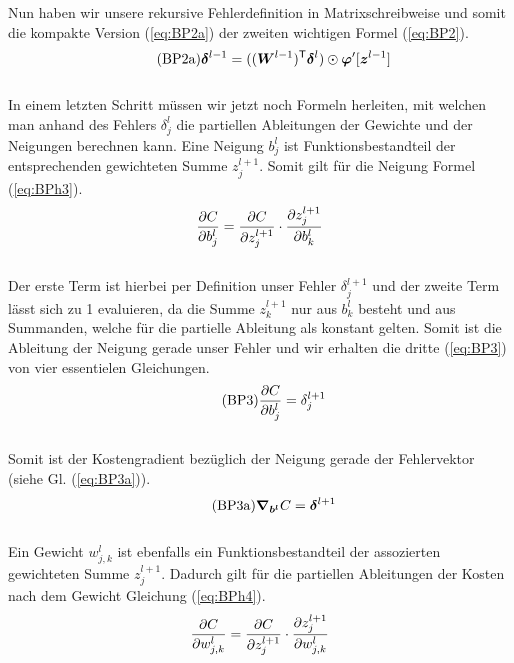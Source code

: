 Nun haben wir unsere rekursive Fehlerdefinition in Matrixschreibweise und somit
die kompakte Version (\ref{eq:BP2a}) der zweiten wichtigen Formel (\ref{eq:BP2}).
\\
\begin{equation}\tag{BP2a}\label{eq:BP2a}
  \bm{\delta}^{l-1} = ((\bm{W}^{l-1})^{\mathsf{T}} \bm{\delta}^l) \odot \bm{\varphi}'[\bm{z}^{l-1}]
\end{equation}
\\
In einem letzten Schritt müssen wir jetzt noch Formeln herleiten, mit welchen
man anhand des Fehlers $\delta_j^l$ die partiellen Ableitungen der Gewichte und
der Neigungen berechnen kann.
\para{}
Eine Neigung $b_j^l$ ist Funktionsbestandteil der entsprechenden gewichteten
Summe $z_j^{l+1}$. Somit gilt für die Neigung Formel (\ref{eq:BPh3}).
\\
\begin{equation}\label{eq:BPh3}
  \frac{\partial C}{\partial b_j^l} = \frac{\partial C}{\partial z_j^{l+1}} \cdot \frac{\partial z_j^{l+1}}{\partial b_k^l}
\end{equation}
\\
Der erste Term ist hierbei per Definition unser Fehler $\delta_j^{l+1}$ und der
zweite Term lässt sich zu 1 evaluieren, da die Summe $z_k^{l+1}$ nur aus
$b_k^l$ besteht und aus Summanden, welche für die partielle Ableitung als konstant gelten.
Somit ist die Ableitung der Neigung gerade unser Fehler und wir erhalten die
dritte (\ref{eq:BP3}) von vier essentielen Gleichungen.
\\
\begin{equation}\tag{BP3}\label{eq:BP3}
  \frac{\partial C}{\partial b_j^l} = \delta_j^{l+1}
\end{equation}
\\
Somit ist der Kostengradient bezüglich der Neigung gerade der Fehlervektor
(siehe Gl. (\ref{eq:BP3a})).
\\
\begin{equation}\tag{BP3a}\label{eq:BP3a}
  \bm{\nabla}_{\bm{b^l}} C =  \bm{\delta}^{l+1}
\end{equation}
\\
Ein Gewicht $w_{j,k}^l$ ist ebenfalls ein Funktionsbestandteil der assozierten
gewichteten Summe $z_j^{l+1}$. Dadurch gilt für die partiellen Ableitungen der
Kosten nach dem Gewicht Gleichung (\ref{eq:BPh4}).
\\
\begin{equation}\label{eq:BPh4}
  \frac{\partial C}{\partial w_{j,k}^l} = \frac{\partial C}{\partial z_j^{l+1}} \cdot \frac{\partial z_j^{l+1}}{\partial w_{j,k}^l}
\end{equation}
